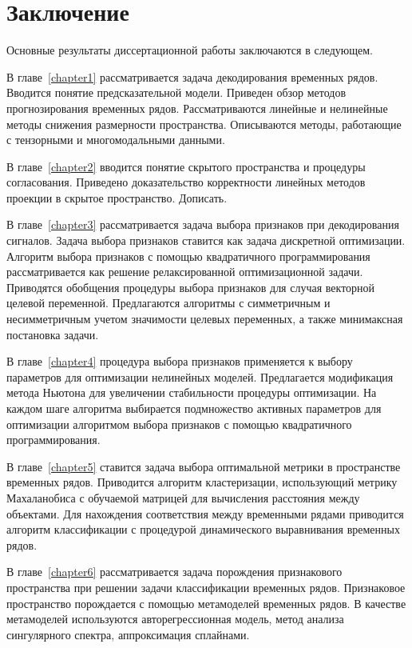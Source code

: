 \chapter*{Заключение}

Основные результаты диссертационной работы заключаются в следующем.

В главе~\ref{chapter1} рассматривается задача декодирования временных рядов.
Вводится понятие предсказательной модели.
Приведен обзор методов прогнозирования временных рядов.
Рассматриваются линейные и нелинейные методы снижения размерности пространства.
Описываются методы, работающие с тензорными и многомодальными данными.

В главе~\ref{chapter2} вводится понятие скрытого пространства и процедуры согласования.
Приведено доказательство корректности линейных методов проекции в скрытое пространство. {\color{red} Дописать.}

В главе~\ref{chapter3} рассматривается задача выбора признаков при декодирования сигналов.
Задача выбора признаков ставится как задача дискретной оптимизации. 
Алгоритм выбора признаков с помощью квадратичного программирования рассматривается как решение релаксированной оптимизационной задачи.
Приводятся обобщения процедуры выбора признаков для случая векторной целевой переменной.
Предлагаются алгоритмы с симметричным и несимметричным учетом значимости целевых переменных, а также минимаксная постановка задачи.

В главе~\ref{chapter4} процедура выбора признаков применяется к выбору параметров для оптимизации нелинейных моделей.
Предлагается модификация метода Ньютона для увеличении стабильности процедуры оптимизации.
На каждом шаге алгоритма выбирается подмножество активных параметров для оптимизации алгоритмом выбора признаков с помощью квадратичного программирования.

В главе~\ref{chapter5} ставится задача выбора оптимальной метрики в пространстве временных рядов.
Приводится алгоритм кластеризации, использующий метрику Махаланобиса с обучаемой матрицей для вычисления расстояния между объектами. 
Для нахождения соответствия между временными рядами приводится алгоритм классификации с процедурой динамического выравнивания временных рядов.

В главе~\ref{chapter6} рассматривается задача порождения признакового пространства при решении задачи классификации временных рядов.
Признаковое пространство порождается с помощью метамоделей временных рядов.
В качестве метамоделей используются авторегрессионная модель, метод анализа сингулярного спектра, аппроксимация сплайнами.